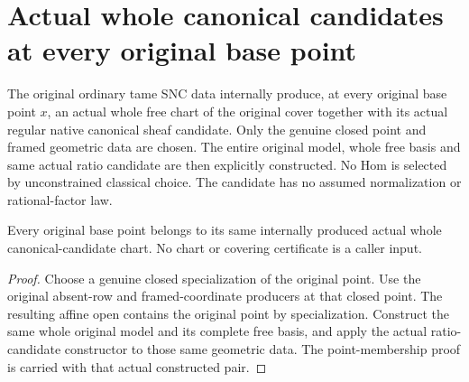 \section{Actual whole canonical candidates at every original base point}

\begin{definition}
\label{def:kn-canonical-every-point-whole-candidate}
\leanok
The original ordinary tame SNC data internally produce, at every original
base point $x$, an actual whole free chart of the original cover together
with its actual regular native canonical sheaf candidate. Only the genuine
closed point and framed geometric data are chosen. The entire original
model, whole free basis and same actual ratio candidate are then explicitly
constructed. No Hom is selected by unconstrained classical choice.
The candidate has no assumed normalization or rational-factor law.
\end{definition}

\begin{lemma}
\label{lem:kn-canonical-every-point-whole-candidate-cover}
\leanok
Every original base point belongs to its same internally produced actual
whole canonical-candidate chart. No chart or covering certificate is a
caller input.
\end{lemma}
\begin{proof}
Choose a genuine closed specialization of the original point. Use the
original absent-row and framed-coordinate producers at that closed point.
The resulting affine open contains the original point by specialization.
Construct the same whole original model and its complete free basis, and
apply the actual ratio-candidate constructor to those same geometric data.
The point-membership proof is carried with that actual constructed pair.
\end{proof}
